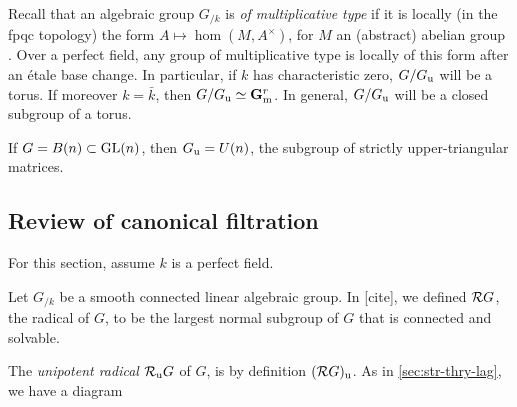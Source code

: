 Recall that an algebraic group $G_{/k}$ is \emph{of multiplicative type} 
if it is locally (in the fpqc topology) the form 
$A\mapsto \hom(M,A^\times)$, for $M$ an (abstract) abelian group 
\cite[IX 1.1]{sga3-ii}. Over a perfect field, any group of multiplicative type 
is locally of this form after an \'etale base change. 
In particular, if $k$ has characteristic zero, $G/G_{\mathrm{u}}$ will be a 
torus. If moreover $k=\bar k$, then $G/G_{\mathrm{u}}\simeq \mathbf{G}_\mathrm{m}^r$. In general, 
$G/G_{\mathrm{u}}$ will be a closed subgroup of a torus. 

\begin{example}
If $G=B(n)\subset \operatorname{GL}(n)$, then $G_{\mathrm{u}}=U(n)$, the subgroup of strictly 
upper-triangular matrices. 
\end{example}





\subsection{Review of canonical filtration}

For this section, assume $k$ is a perfect field. 

Let $G_{/k}$ be a smooth connected linear algebraic group. In [cite], we defined 
$\mathcal{R} G$, the radical of $G$, to be the largest normal subgroup of $G$ that is 
connected and solvable. 

The \emph{unipotent radical} $\mathcal{R}_\mathrm{u} G$ of $G$, is by definition 
$(\mathcal{R} G)_{\mathrm{u}}$. As in \autoref{sec:str-thry-lag}, we have a diagram 
\begin{center}
\end{center}

